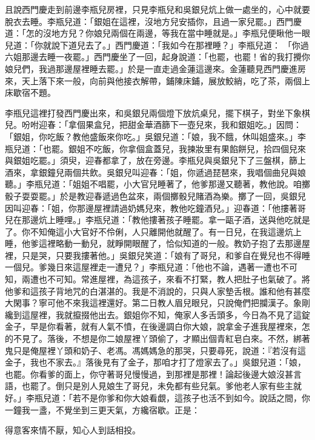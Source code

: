 且說西門慶走到前邊李瓶兒房裡，只見李瓶兒和吳銀兒炕上做一處坐的，心中就要脫衣去睡。李瓶兒道：「銀姐在這裡，沒地方兒安插你，且過一家兒罷。」西門慶道：「怎的沒地方兒？你娘兒兩個在兩邊，等我在當中睡就是。」李瓶兒便瞅他一眼兒道：「你就說下道兒去了。」西門慶道：「我如今在那裡睡？」李瓶兒道： 「你過六姐那邊去睡一夜罷。」西門慶坐了一回，起身說道：「也罷，也罷！省的我打攪你娘兒們，我過那邊屋裡睡去罷。」於是一直走過金蓮這邊來。金蓮聽見西門慶進房來，天上落下來一般，向前與他接衣解帶，鋪陳床鋪，展放鮫綃，吃了茶，兩個上床歇宿不題。

李瓶兒這裡打發西門慶出來，和吳銀兒兩個燈下放炕桌兒，擺下棋子，對坐下象棋兒。吩咐迎春：「拿個果盒兒，把甜金華酒篩下一壺兒來，我和銀姐吃。」因問： 「銀姐，你吃飯？教他盛飯來你吃。」吳銀兒道：「娘，我不餓，休叫姐盛來。」李瓶兒道：「也罷。銀姐不吃飯，你拿個盒蓋兒，我揀妝里有果餡餅兒，拾四個兒來與銀姐吃罷。」須臾，迎春都拿了，放在旁邊。李瓶兒與吳銀兒下了三盤棋，篩上酒來，拿銀鐘兒兩個共飲。吳銀兒叫迎春：「姐，你遞過琵琶來，我唱個曲兒與娘聽。」李瓶兒道：「姐姐不唱罷，小大官兒睡著了，他爹那邊又聽著，教他說。咱擲骰子耍耍罷。」於是教迎春遞過色盆來，兩個擲骰兒賭酒為樂。擲了一回，吳銀兒因叫迎春：「姐，你那邊屋裡請過奶媽兒來，教他吃鐘酒兒。」迎春道：「他摟著哥兒在那邊炕上睡哩。」李瓶兒道：「教他摟著孩子睡罷。拿一甌子酒，送與他吃就是了。你不知俺這小大官好不伶俐，人只離開他就醒了。有一日兒，在我這邊炕上睡，他爹這裡略動一動兒，就睜開眼醒了，恰似知道的一般。教奶子抱了去那邊屋裡，只是哭，只要我摟著他。」吳銀兒笑道：「娘有了哥兒，和爹自在覺兒也不得睡一個兒。爹幾日來這屋裡走一遭兒？」李瓶兒道：「他也不論，遇著一遭也不可知，兩遭也不可知。常進屋裡，為這孩子，來看不打緊，教人把肚子也氣破了。將他爹和這孩子背地咒的白湛湛的。我是不消說的，只與人家墊舌根。誰和他有甚麼大閑事？寧可他不來我這裡還好。第二日教人眉兒眼兒，只說俺們把攔漢子。象剛纔到這屋裡，我就攛掇他出去。銀姐你不知，俺家人多舌頭多，今日為不見了這錠金子，早是你看著，就有人氣不憤，在後邊調白你大娘，說拿金子進我屋裡來，怎的不見了。落後，不想是你二娘屋裡丫頭偷了，才顯出個青紅皂白來。不然，綁著鬼只是俺屋裡丫頭和奶子、老馮。馮媽媽急的那哭，只要尋死，說道：『若沒有這金子，我也不家去。』落後見有了金子，那咱才打了燈家去了。」吳銀兒道：「娘，也罷。你看爹的面上，你守著哥兒慢慢過，到那裡是那裡！論起後邊大娘沒甚言語，也罷了。倒只是別人見娘生了哥兒，未免都有些兒氣。爹他老人家有些主就好。」李瓶兒道：「若不是你爹和你大娘看覷，這孩子也活不到如今。說話之間，你一鐘我一盞，不覺坐到三更天氣，方纔宿歇。正是：

得意客來情不厭，知心人到話相投。

